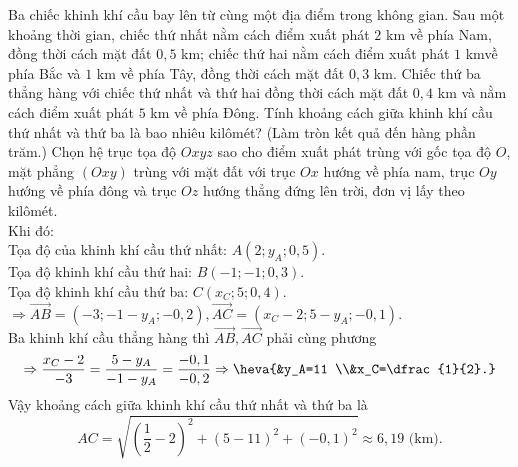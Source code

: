 \begin{ex}%
	Ba chiếc khinh khí cầu bay lên từ cùng một địa điểm trong không gian. Sau một khoảng thời gian, chiếc thứ nhất nằm cách điểm xuất phát $2$ km về phía Nam, đồng thời cách mặt đất $0,5$ km; chiếc thứ hai nằm cách điểm xuất phát $1$ kmvề phía Bắc và $1$ km về phía Tây, đồng thời cách mặt đất $0,3$ km. Chiếc thứ ba thẳng hàng với chiếc thứ nhất và thứ hai đồng thời cách mặt đất $0,4$ km và nằm cách điểm xuất phát $5$ km về phía Đông. Tính khoảng cách giữa khinh khí cầu thứ nhất và thứ ba là bao nhiêu kilômét? (Làm tròn kết quả đến hàng phần trăm.)
	\loigiai
	{
		Chọn hệ trục tọa độ $Oxyz$ sao cho điểm xuất phát trùng với gốc tọa độ $O$, mặt phẳng $\left(Oxy\right)$ trùng với mặt đất với trục $Ox$ hướng về phía nam, trục $Oy$ hướng về phía đông và trục $Oz$ hướng thẳng đứng lên trời, đơn vị lấy theo kilômét.\\
		Khi đó:\\
		Tọa độ của khinh khí cầu thứ nhất: $A\left(2;y_A;0,5\right)$.\\
		Tọa độ khinh khí cầu thứ hai: $B\left(-1;-1;0,3\right)$.\\
		Tọa độ khinh khí cầu thứ ba: $C\left(x_C;5;0,4\right)$.\\
		$\Rightarrow \overrightarrow{AB}=\left(-3;-1-y_A;-0,2\right),\overrightarrow{AC}=\left(x_C-2;5-y_A;-0,1\right)$.\\
		Ba khinh khí cầu thẳng hàng thì $\overrightarrow{AB},\overrightarrow{AC}$ phải cùng phương
		$$\Rightarrow \dfrac{x_C-2}{-3}=\dfrac{5-y_A}{-1-y_A}=\dfrac{-0,1}{-0,2}\Rightarrow \heva{&y_A=11 \\&x_C=\dfrac{1}{2}.}$$
		Vậy khoảng cách giữa khinh khí cầu thứ nhất và thứ ba là $$AC=\sqrt{\left(\dfrac{1}{2}-2\right)^2+\left(5-11\right)^2+\left(-0,1\right)^2}\approx 6{,}19\text{ (km).}$$
	}
\end{ex}

